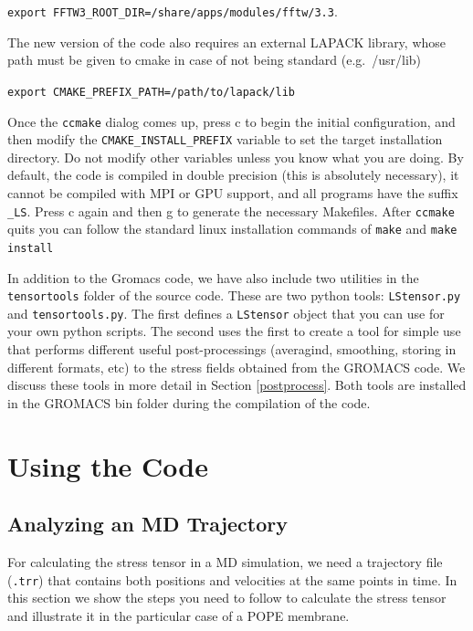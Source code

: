 \documentclass[10pt,letterpaper,notitlepage]{article}
\begin{document}
\bigskip
\texttt{export FFTW3\_ROOT\_DIR=/share/apps/modules/fftw/3.3}.
\bigskip

The new version of the code also requires an external LAPACK library, whose path must be given to cmake in case of not being standard (e.g.~/usr/lib)

\bigskip
\texttt{export CMAKE\_PREFIX\_PATH=/path/to/lapack/lib}
\bigskip

Once the \texttt{ccmake} dialog comes up, press c to begin the initial configuration, and then modify the \texttt{CMAKE\_INSTALL\_PREFIX} variable to set the target installation directory. Do not modify other variables unless you know what you are doing. By default, the code is compiled in double precision (this is absolutely necessary), it cannot be compiled with MPI or GPU support, and all programs have the suffix \texttt{\_LS}. Press c again and then g to generate the necessary Makefiles. After \texttt{ccmake} quits you can follow the standard linux installation commands of \texttt{make} and \texttt{make install}

In addition to the Gromacs code, we have also include two utilities in the \texttt{tensortools} folder of the source code. These are two python tools: \texttt{LStensor.py} and \texttt{tensortools.py}. The first defines a \texttt{LStensor} object that you can use for your own python scripts. The second uses the first to create a tool for simple use that performs different useful post-processings (averagind, smoothing, storing in different formats, etc) to the stress fields obtained from the GROMACS code. We discuss these tools in more detail in Section \ref{postprocess}. Both tools are installed in the GROMACS bin folder during the compilation of the code.

\section{Using the Code}

\subsection{Analyzing an MD Trajectory}

For calculating the stress tensor in a MD simulation, we need a trajectory file (\texttt{.trr}) that contains both positions and velocities at the same points in time. In this section we show the steps you need to follow to calculate the stress tensor and illustrate it in the particular case of a POPE membrane. 
\end{document}

